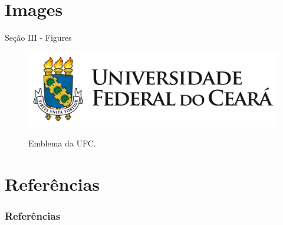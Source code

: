 \documentclass{libs/ufc_format}
\begin{document}
\section{Images}
\begin{frame}{Seção III - Figures}
    \begin{figure}
        \centering
        \caption{Emblema da UFC.}
        \includegraphics[scale=0.3]{libs/brasao1_horizontal_cor.pdf}
        \label{fig:ufc_emblem}
    \end{figure}
\end{frame}

\section{Referências}
\begin{frame}[allowframebreaks]
    \frametitle{Referências}
    \printbibliography
\end{frame}
\end{document}
